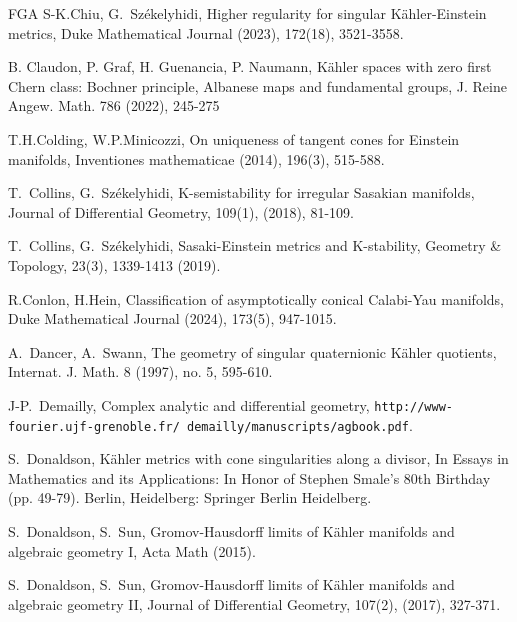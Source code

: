 \documentclass[12pt,a4paper]{amsart}
\theoremstyle{remark}
\theoremstyle{definition}
\begin{document}
\begin{thebibliography}{FGA}
S-K.Chiu, G.~Sz\'ekelyhidi, 
Higher regularity for singular K\"ahler-Einstein metrics, Duke Mathematical Journal (2023), 172(18), 3521-3558.

B. Claudon, P. Graf, H. Guenancia, P. Naumann, 
K\"ahler spaces with zero first Chern class: Bochner principle, Albanese maps and fundamental groups, 
J. Reine Angew. Math. 786 (2022), 245-275 


T.H.Colding, W.P.Minicozzi, On uniqueness of tangent cones for Einstein manifolds, Inventiones mathematicae (2014), 196(3), 515-588.


T.~Collins, G.~Sz\'ekelyhidi, 
K-semistability for irregular Sasakian manifolds, 
Journal of Differential Geometry, 109(1), (2018),  81-109. 

T.~Collins, G.~Sz\'ekelyhidi, 
Sasaki-Einstein metrics and K-stability, 
Geometry \& Topology, 23(3), 1339-1413 (2019). 

R.Conlon, H.Hein, Classification of asymptotically conical Calabi-Yau manifolds, Duke Mathematical Journal (2024), 173(5), 947-1015. 

A.~Dancer, A.~Swann, 
The geometry of singular quaternionic K\"ahler quotients, 
Internat. J. Math. 8 (1997), no. 5, 595-610.

J-P.~Demailly, Complex analytic and differential geometry, 
{\texttt{http://www-fourier.ujf-grenoble.fr/~demailly/manuscripts/agbook.pdf}}.

S.~Donaldson, K\"ahler metrics with cone singularities along a divisor, In Essays in Mathematics and its Applications: In Honor of Stephen Smale's 80th Birthday (pp. 49-79). Berlin, Heidelberg: Springer Berlin Heidelberg. 


S.~Donaldson, S.~Sun, 
Gromov-Hausdorff limits of K\"ahler manifolds and algebraic geometry I, 
Acta Math (2015). 

S.~Donaldson, S.~Sun, 
Gromov-Hausdorff limits of K\"ahler manifolds and algebraic geometry II, Journal of Differential Geometry, 107(2), (2017), 327-371.


\end{thebibliography}
\end{document}
